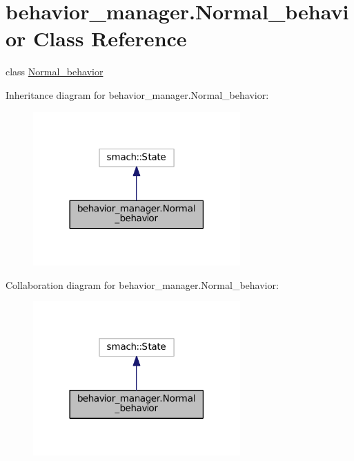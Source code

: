 \hypertarget{classbehavior__manager_1_1Normal__behavior}{}\section{behavior\+\_\+manager.\+Normal\+\_\+behavior Class Reference}
\label{classbehavior__manager_1_1Normal__behavior}


class \hyperlink{classbehavior__manager_1_1Normal__behavior}{Normal\+\_\+behavior}  




Inheritance diagram for behavior\+\_\+manager.\+Normal\+\_\+behavior\+:
\nopagebreak
\begin{figure}[H]
\begin{center}
\leavevmode
\includegraphics[width=225pt]{classbehavior__manager_1_1Normal__behavior__inherit__graph}
\end{center}
\end{figure}


Collaboration diagram for behavior\+\_\+manager.\+Normal\+\_\+behavior\+:
\nopagebreak
\begin{figure}[H]
\begin{center}
\leavevmode
\includegraphics[width=225pt]{classbehavior__manager_1_1Normal__behavior__coll__graph}
\end{center}
\end{figure}
